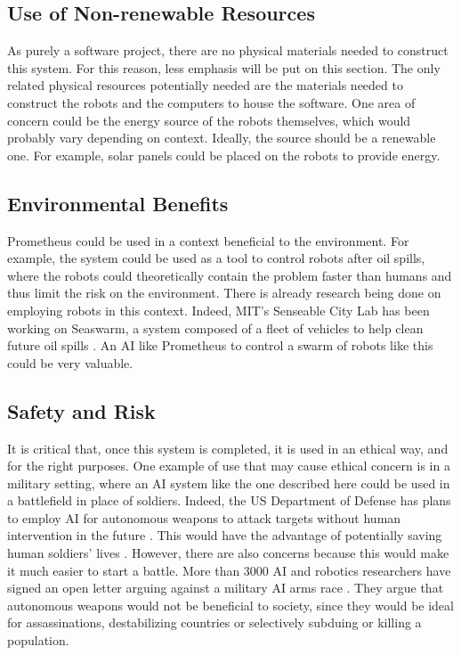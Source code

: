 \documentclass[titlepage,11pt]{article}
\begin{document}
\subsection{Use of Non-renewable Resources}

As purely a software project, there are no physical materials needed to construct this system. For this reason, less emphasis will be put on this section. The only related physical resources potentially needed are the materials needed to construct the robots and the computers to house the software. One area of concern could be the energy source of the robots themselves, which would probably vary depending on context. Ideally, the source should be a renewable one. For example, solar panels could be placed on the robots to provide energy.

\subsection{Environmental Benefits}

Prometheus could be used in a context beneficial to the environment. For example, the system could be used as a tool to control robots after oil spills, where the robots could theoretically contain the problem faster than humans and thus limit the risk on the environment. There is already research being done on employing robots in this context. Indeed, MIT's Senseable City Lab has been working on Seaswarm, a system composed of a fleet of vehicles to help clean future oil spills \cite{seaswarm}. An AI like Prometheus to control a swarm of robots like this could be very valuable. 

\subsection{Safety and Risk}

It is critical that, once this system is completed, it is used in an ethical way, and for the right purposes. One example of use that may cause ethical concern is in a military setting, where an AI system like the one described here could be used in a battlefield in place of soldiers. Indeed, the US Department of Defense has plans to employ AI for autonomous weapons to attack targets without human intervention in the future \cite{military}. This would have the advantage of potentially saving human soldiers' lives \cite{define_military_ai}. However, there are also concerns because this would make it much easier to start a battle. More than 3000 AI and robotics researchers have signed an open letter arguing against a military AI arms race \cite{openletter}. They argue that autonomous weapons would not be beneficial to society, since they would be ideal for assassinations, destabilizing countries or selectively subduing or killing a population.
\end{document}
